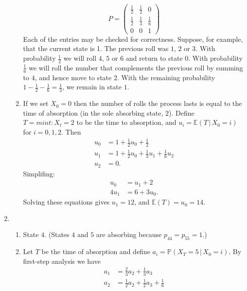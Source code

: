 \documentclass[11pt,a4paper]{report}
\begin{document}
\begin{enumerate}
\begin{enumerate}
            $$P=\begin{pmatrix}
                \frac{1}{2} & \frac{1}{2} & 0\\
                \frac{1}{2} & \frac{1}{3} & \frac{1}{6}\\
                0 & 0 & 1
            \end{pmatrix}$$
            Each of the entries may be checked for correctness. Suppose, for example, that the current state is 1. The previous roll was $1$, $2$ or $3$. With probability $\frac{1}{2}$ we will roll $4$, $5$ or $6$ and return to state $0$. With probability $\frac{1}{6}$ we will roll the number that complements the previous roll by summing to $4$, and hence move to state $2$. With the remaining probability $1-\frac{1}{2}-\frac{1}{6}=\frac{1}{3}$, we remain in state $1$.
            \item If we set $X_0 = 0$ then the number of rolls the process lasts is equal to the time of absorption (in the sole absorbing state, $2$). Define $T = min{t : X_t = 2}$ to be the time to absorption, and $u_i = \mathbb{E}(T\, | \, X_0 = i)$ for $i = 0, 1, 2$. Then
            \begin{align*}
                u_0 &= 1+\frac{1}{2}u_0+\frac{1}{2}\\
                u_1 &= 1+\frac{1}{2}u_0+\frac{1}{3}u_1+\frac{1}{6}u_2\\
                u_2 &= 0.
            \end{align*}
            Simplifing:
            \begin{align*}
                u_0 &= u_1+2\\
                4u_1 &= 6+3u_0.
            \end{align*}
            Solving these equations gives $u_1 = 12$, and $\mathbb{E}(T) = u_0 = 14$.            
        \end{enumerate}
        \item 
        \begin{enumerate}
            \item State $4$. (States $4$ and $5$ are absorbing because $p_{44} = p_{55} = 1$.)
            \item Let $T$ be the time of absorption and define $a_i = \mathbb{P}(X_T = 5\, |\, X_0 = i)$. By first-step analysis we have
            \begin{align*}
                a_1 &= \frac{2}{3}a_2+\frac{1}{3}a_3\\
                a_2 &= \frac{1}{2}a_2+\frac{1}{2}a_3+\frac{1}{6}\\

\end{align*}
\end{enumerate}
\end{enumerate}
\end{document}
